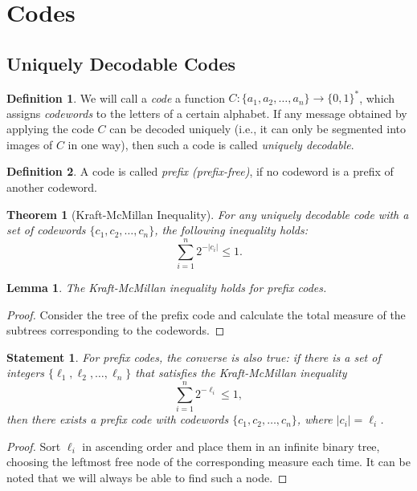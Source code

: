 \documentclass[12pt,sans]{article}
\newcommand{\bits}{\{0,1\}}
\newcommand{\bitstr}{\bits^*}
\newcommand{\seqn}[2]{{#1}_1,{#1}_2,\dotsc,{#1}_{#2}}
\theoremstyle{definition}
\newtheorem{definition}{Definition}[section]
\theoremstyle{plain}
\newtheorem{theorem}{Theorem}[section]
\newtheorem{lemma}{Lemma}[section]
\newtheorem{statement}{Statement}[section]
\theoremstyle{remark}
\begin{document}
\section{Codes}
\subsection{Uniquely Decodable Codes}
\begin{definition}
    We will call a \emph{code} a function \(C:\{\seqn{a}{n}\}\to\bitstr\),
    which assigns \emph{codewords} to the letters of a certain alphabet.
    If any message obtained by applying the code \(C\) can be decoded
    uniquely (i.e., it can only be segmented into images of \(C\) in one way),
    then such a code is called \emph{uniquely decodable}.
\end{definition}

\begin{definition}
    A code is called \emph{prefix (prefix-free)}, if no
    codeword is a prefix of another codeword.
\end{definition}

\begin{theorem}[Kraft-McMillan Inequality]\label{thm:mcmill}
    For any uniquely decodable code with a set of codewords
    \(\{\seqn{c}{n}\}\), the following inequality holds:
    \[
    \sum_{i=1}^{n} 2^{-|c_i|} \le 1.
    \]
\end{theorem}

\begin{lemma}
    The Kraft-McMillan inequality holds for prefix codes.
\end{lemma}

\begin{proof}
    Consider the tree of the prefix code and calculate the total measure of the subtrees
    corresponding to the codewords.
\end{proof}

\begin{statement}
    For prefix codes, the converse is also true: if there is a set of integers
    \(\{\seqn{\ell}{n}\}\)
    that satisfies the Kraft-McMillan inequality
    \[
    \sum_{i=1}^{n} 2^{-\ell_i} \le 1,
    \]
    then there exists a prefix code with codewords \(\{\seqn{c}{n}\}\), where \(|c_i| = \ell_i\).
\end{statement}

\begin{proof}
    Sort \(\ell_i\) in ascending order and place them in an infinite
    binary tree, choosing the leftmost free node
    of the corresponding measure each time. It can be noted that we will always be able to find such a node.
\end{proof}
\end{document}
